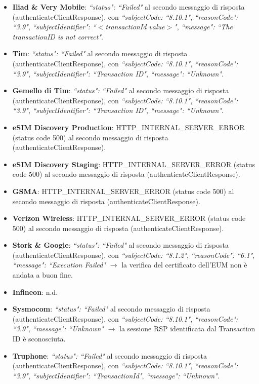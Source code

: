 \documentclass[10pt, oneside]{book}
\begin{document}
\begin{itemize}
\item \textbf{Iliad \& Very Mobile}: \textit{``status": ``Failed"} al secondo messaggio di risposta (authenticateClientResponse), con \textit{``subjectCode: ``8.10.1"}, \textit{``reasonCode": ``3.9"}, \textit{``subjectIdentifier": ``$<$transactionId value$>$"}, \textit{``message": ``The transactionID is not correct"}.
\item \textbf{Tim}: \textit{``status": ``Failed"} al secondo messaggio di risposta (authenticateClientResponse), con \textit{``subjectCode: ``8.10.1"}, \textit{``reasonCode": ``3.9"}, \textit{``subjectIdentifier": ``Transaction ID"}, \textit{``message": ``Unknown"}.
\item \textbf{Gemello di Tim}: \textit{``status": ``Failed"} al secondo messaggio di risposta (authenticateClientResponse), con \textit{``subjectCode: ``8.10.1"}, \textit{``reasonCode": ``3.9"}, \textit{``subjectIdentifier": ``Transaction ID"}, \textit{``message": ``Unknown"}.
\item \textbf{eSIM Discovery Production}: HTTP\_INTERNAL\_SERVER\_ERROR (status code 500) al secondo messaggio di risposta (authenticateClientResponse).
\item \textbf{eSIM Discovery Staging}: HTTP\_INTERNAL\_SERVER\_ERROR (status code 500) al secondo messaggio di risposta (authenticateClientResponse).
\item \textbf{GSMA}: HTTP\_INTERNAL\_SERVER\_ERROR (status code 500) al secondo messaggio di risposta (authenticateClientResponse).
\item \textbf{Verizon Wireless}: HTTP\_INTERNAL\_SERVER\_ERROR (status code 500) al secondo messaggio di risposta (authenticateClientResponse).
\item \textbf{Stork \& Google}: \textit{``status": ``Failed"} al secondo messaggio di risposta (authenticateClientResponse), con \textit{``subjectCode: ``8.1.2"}, \textit{``reasonCode": ``6.1"}, \textit{``message": ``Execution Failed"} $\rightarrow$ la verifica del certificato dell'EUM non è andata a buon fine.
\item \textbf{Infineon}: n.d.
\item \textbf{Sysmocom}:  \textit{``status": ``Failed"} al secondo messaggio di risposta (authenticateClientResponse), con \textit{``subjectCode: ``8.10.1"}, \textit{``reasonCode": ``3.9"}, \textit{``message": ``Unknown"} $\rightarrow$ la sessione RSP identificata dal Transaction ID è sconosciuta.
\item \textbf{Truphone}: \textit{``status": ``Failed"} al secondo messaggio di risposta (authenticateClientResponse), con \textit{``subjectCode: ``8.10.1"}, \textit{``reasonCode": ``3.9"}, \textit{``subjectIdentifier": ``TransactionId"}, \textit{``message": ``Unknown"}.

\end{itemize}
\end{document}
